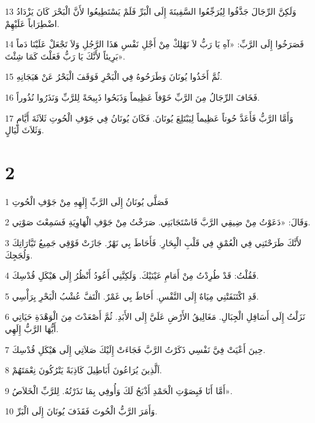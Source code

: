 \par 13 وَلَكِنَّ الرِّجَالَ جَذَّفُوا لِيُرَجِّعُوا السَّفِينَةَ إِلَى الْبَرِّ فَلَمْ يَسْتَطِيعُوا لأَنَّ الْبَحْرَ كَانَ يَزْدَادُ اضْطِرَاباً عَلَيْهِمْ.
\par 14 فَصَرَخُوا إِلَى الرَّبِّ: «آهِ يَا رَبُّ لاَ نَهْلِكْ مِنْ أَجْلِ نَفْسِ هَذَا الرَّجُلِ وَلاَ تَجْعَلْ عَلَيْنَا دَماً بَرِيئاً لأَنَّكَ يَا رَبُّ فَعَلْتَ كَمَا شِئْتَ».
\par 15 ثُمَّ أَخَذُوا يُونَانَ وَطَرَحُوهُ فِي الْبَحْرِ فَوَقَفَ الْبَحْرُ عَنْ هَيَجَانِهِ.
\par 16 فَخَافَ الرِّجَالُ مِنَ الرَّبِّ خَوْفاً عَظِيماً وَذَبَحُوا ذَبِيحَةً لِلرَّبِّ وَنَذَرُوا نُذُوراً.
\par 17 وَأَمَّا الرَّبُّ فَأَعَدَّ حُوتاً عَظِيماً لِيَبْتَلِعَ يُونَانَ. فَكَانَ يُونَانُ فِي جَوْفِ الْحُوتِ ثَلاَثَةَ أَيَّامٍ وَثَلاَثَ لَيَالٍ.

\chapter{2}

\par 1 فَصَلَّى يُونَانُ إِلَى الرَّبِّ إِلَهِهِ مِنْ جَوْفِ الْحُوتِ
\par 2 وَقَالَ: «دَعَوْتُ مِنْ ضِيقِي الرَّبَّ فَاسْتَجَابَنِي. صَرَخْتُ مِنْ جَوْفِ الْهَاوِيَةِ فَسَمِعْتَ صَوْتِي.
\par 3 لأَنَّكَ طَرَحْتَنِي فِي الْعُمْقِ فِي قَلْبِ الْبِحَارِ. فَأَحَاطَ بِي نَهْرٌ. جَازَتْ فَوْقِي جَمِيعُ تَيَّارَاتِكَ وَلُجَجِكَ.
\par 4 فَقُلْتُ: قَدْ طُرِدْتُ مِنْ أَمَامِ عَيْنَيْكَ. وَلَكِنَّنِي أَعُودُ أَنْظُرُ إِلَى هَيْكَلِ قُدْسِكَ.
\par 5 قَدِ اكْتَنَفَتْنِي مِيَاهٌ إِلَى النَّفْسِ. أَحَاطَ بِي غَمْرٌ. الْتَفَّ عُشْبُ الْبَحْرِ بِرَأْسِي.
\par 6 نَزَلْتُ إِلَى أَسَافِلِ الْجِبَالِ. مَغَالِيقُ الأَرْضِ عَلَيَّ إِلَى الأَبَدِ. ثُمَّ أَصْعَدْتَ مِنَ الْوَهْدَةِ حَيَاتِي أَيُّهَا الرَّبُّ إِلَهِي.
\par 7 حِينَ أَعْيَتْ فِيَّ نَفْسِي ذَكَرْتُ الرَّبَّ فَجَاءَتْ إِلَيْكَ صَلاَتِي إِلَى هَيْكَلِ قُدْسِكَ.
\par 8 اَلَّذِينَ يُرَاعُونَ أَبَاطِيلَ كَاذِبَةً يَتْرُكُونَ نِعْمَتَهُمْ.
\par 9 أَمَّا أَنَا فَبِصَوْتِ الْحَمْدِ أَذْبَحُ لَكَ وَأُوفِي بِمَا نَذَرْتُهُ. لِلرَّبِّ الْخَلاَصُ».
\par 10 وَأَمَرَ الرَّبُّ الْحُوتَ فَقَذَفَ يُونَانَ إِلَى الْبَرِّ.

